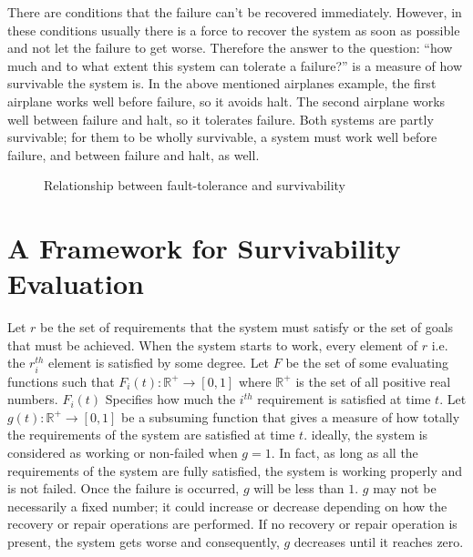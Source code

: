 \documentclass[onecolumn,conference]{IEEEtran}
\begin{document}
    There are conditions that the failure can't be recovered immediately. However, in these conditions usually there is a force to recover the system as soon as possible and not let the failure to get worse. Therefore the answer to the question: ``how much and to what extent this system can tolerate a failure?'' is a measure of how survivable the system is. In the above mentioned airplanes example, the first airplane works well before failure, so it avoids halt. The second airplane works well between failure and halt, so it tolerates failure. Both systems are partly survivable; for them to be wholly survivable, a system must work well before failure, and between failure and halt, as well.

    \begin{figure}[htbp]
        \centering
        \caption{Relationship between fault-tolerance and survivability}
        \label{fig:3}
    \end{figure}

    \section{A Framework for Survivability Evaluation} \label{sec:fram}
    Let $r$ be the set of requirements that the system must satisfy or the set of goals that must be achieved. When the system starts to work, every element of $r$ i.e. the $r_i^{th}$ element is satisfied by some degree. Let $F$ be the set of some evaluating functions such that $F_i\left( t \right):\mathbb{R}^+\rightarrow\left[ 0,1 \right]$ where $\mathbb{R}^+$ is the set of all positive real numbers. $F_i\left( t \right)$ Specifies how much the $i^{th}$ requirement is satisfied at time $t$. Let $g\left( t \right):\mathbb{R}^+\rightarrow\left[ 0,1 \right]$ be a subsuming function that gives a measure of how totally the requirements of the system are satisfied at time $t$. ideally, the system is considered as working or non-failed when $g=1$. In fact, as long as all the requirements of the system are fully satisfied, the system is working properly and is not failed. Once the failure is occurred, $g$ will be less than $1$. $g$ may not be necessarily a fixed number; it could increase or decrease depending on how the recovery or repair operations are performed. If no recovery or repair operation is present, the system gets worse and consequently, $g$ decreases until it reaches zero.
\end{document}
